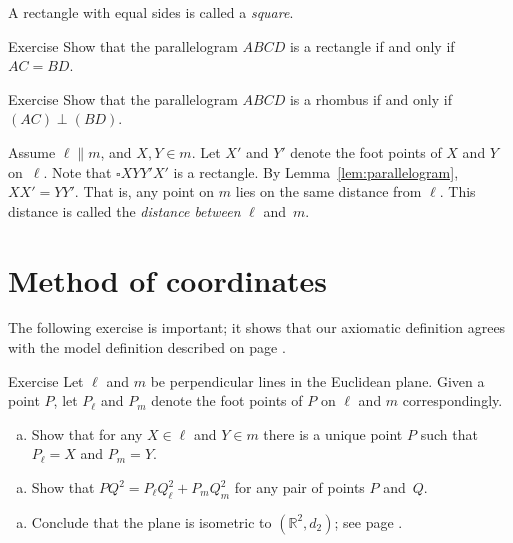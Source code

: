 A rectangle with equal sides is called a \emph{square}.

\begin{thm}{Exercise}\label{ex:rectangle}
Show that the parallelogram $ABCD$ is a rectangle
if and only if $AC=BD$.
\end{thm}

\begin{thm}{Exercise}\label{ex:romb2}
Show that the parallelogram $ABCD$ is a rhombus
if and only if $(AC)\perp (BD)$.
\end{thm}

Assume $\ell\parallel m$, and $X,Y\in m$.
Let $X'$ and $Y'$ denote the foot points of $X$ and $Y$ on~$\ell$.
Note that $\square XYY'X'$ is a rectangle.
By Lemma~\ref{lem:parallelogram}, $XX'=YY'$.
That is, any point on $m$ lies on the same distance from $\ell$.
This distance is called the \emph{distance between} $\ell$ and~$m$.


\section*{Method of coordinates}

The following exercise is important;
it shows that our axiomatic definition agrees with the model definition described on page \pageref{def:d_2}.


\begin{thm}{Exercise}\label{ex:coordinates} 
Let $\ell$ and $m$ be perpendicular lines in the Euclidean plane.
Given a point $P$, let $P_\ell$ and $P_m$ denote the foot points of $P$ on $\ell$ and $m$ correspondingly.


\begin{enumerate}[(a)]
\item Show that for any $X\in \ell$ and $Y\in m$ there is a unique point $P$ such that $P_\ell=X$ and $P_m=Y$.
\end{enumerate}

\begin{enumerate}[(a)]\addtocounter{enumi}{1}
\item
Show that 
$PQ^2=P_\ell Q_\ell^2+P_mQ_m^2$
for any pair of points $P$ and~$Q$.
\end{enumerate}

\begin{enumerate}[(a)]\addtocounter{enumi}{2}
\item Conclude that the plane is isometric to $(\mathbb{R}^2,d_2)$; see page \pageref{def:d_2}.
\end{enumerate}

\end{thm}

